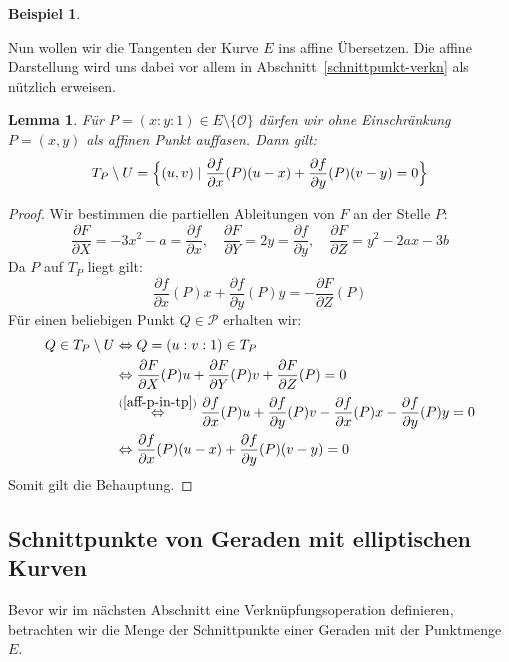 \documentclass[hidelinks]{article}
\theoremstyle{plain}
\newtheorem{lem}[thm]{Lemma}
\theoremstyle{definition}
\newtheorem{bsp}[thm]{Beispiel}
\theoremstyle{rem}
\newcommand{\patinf}{\mathcal{O}}
\begin{document}
\begin{sloppypar}
\begin{bsp}
\end{bsp}
Nun wollen wir die Tangenten der Kurve $E$ ins affine Übersetzen. Die affine Darstellung wird uns dabei vor allem in Abschnitt~\ref{schnittpunkt-verkn} als nützlich erweisen.
\begin{lem}\label{aff-tang}
	Für $P=(x:y:1)\in E\setminus\{\patinf\}$ dürfen wir ohne Einschränkung $P=(x,y)$ als affinen Punkt auffasen. Dann gilt:
	\begin{equation*}
		T_P\setminus U =\Bigl\{(u,v)\mid \frac{\partial f}{\partial x}(P)(u-x)+\frac{\partial f}{\partial y}(P)(v-y)=0\Bigr\}
	\end{equation*}
\end{lem}
\begin{proof}
Wir bestimmen die partiellen Ableitungen von $F$ an der Stelle $P$:
\begin{equation*}
		\frac{\partial F}{\partial X}=-3x^2-a=\frac{\partial f}{\partial x},\quad \frac{\partial F}{\partial Y}=2y=\frac{\partial f}{\partial y},\quad \frac{\partial F}{\partial Z}=y^2-2ax-3b
\end{equation*}
Da $P$ auf $T_P$ liegt gilt:
\begin{equation}\label{aff-p-in-tp}
	\frac{\partial f}{\partial x}(P)x+\frac{\partial f}{\partial y}(P)y=-\frac{\partial F}{\partial Z}(P)
\end{equation}
Für einen beliebigen Punkt $Q\in\mathcal{P}$ erhalten wir:
\begin{align*}
	Q\in T_P\setminus U & \Leftrightarrow Q=(u:v:1)\in T_P\\
			    & \Leftrightarrow \frac{\partial F}{\partial X}(P)u+\frac{\partial F}{\partial Y}(P)v+\frac{\partial F}{\partial Z}(P)=0\\
	      & \stackrel{(\ref{aff-p-in-tp})}{\Leftrightarrow} \frac{\partial f}{\partial x}(P)u+\frac{\partial f}{\partial y}(P)v-\frac{\partial f}{\partial x}(P)x-\frac{\partial f}{\partial y}(P)y=0\\
	& \Leftrightarrow \frac{\partial f}{\partial x}(P)(u-x)+\frac{\partial f}{\partial y}(P)(v-y)=0
\end{align*}
Somit gilt die Behauptung.
\end{proof}

\subsection{Schnittpunkte von Geraden mit elliptischen Kurven}
Bevor wir im nächsten Abschnitt eine Verknüpfungsoperation definieren, betrachten wir die Menge der Schnittpunkte einer Geraden mit der Punktmenge $E$.\\


\end{sloppypar}
\end{document}
